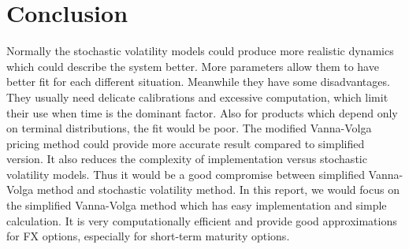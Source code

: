 \section{Conclusion}
Normally the stochastic volatility models could produce more realistic dynamics which could describe the system better. More parameters allow them to have better fit for each different situation. Meanwhile they have some disadvantages. They usually need delicate calibrations and excessive computation, which limit their use when time is the dominant factor. Also for products which depend only on terminal distributions, the fit would be poor.
\newline
\newline
The modified Vanna-Volga pricing method could provide more accurate result compared to simplified version. It also reduces the complexity of implementation versus stochastic volatility models. Thus it would be a good compromise between simplified Vanna-Volga method and stochastic volatility method.
\newline
\newline
 In this report, we would focus on the simplified Vanna-Volga method which has easy implementation and simple calculation. It is very computationally efficient and provide good approximations for FX options, especially for short-term maturity options.